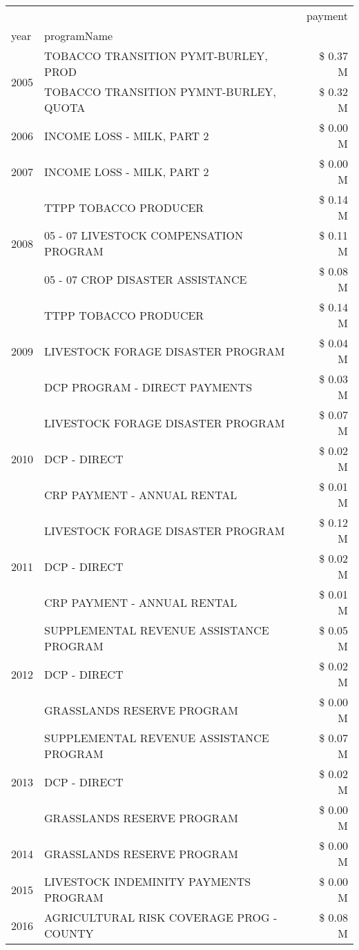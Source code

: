 \begin{tabular}{llr}
\toprule
 &  & payment \\
year & programName &  \\
\midrule
\multirow[t]{2}{*}{2005} & TOBACCO TRANSITION PYMT-BURLEY, PROD & \$ 0.37 M \\
 & TOBACCO TRANSITION PYMNT-BURLEY, QUOTA & \$ 0.32 M \\
\cline{1-3}
2006 & INCOME LOSS - MILK, PART 2 & \$ 0.00 M \\
\cline{1-3}
2007 & INCOME LOSS - MILK, PART 2 & \$ 0.00 M \\
\cline{1-3}
\multirow[t]{3}{*}{2008} & TTPP TOBACCO PRODUCER & \$ 0.14 M \\
 & 05 - 07 LIVESTOCK COMPENSATION PROGRAM & \$ 0.11 M \\
 & 05 - 07 CROP DISASTER ASSISTANCE & \$ 0.08 M \\
\cline{1-3}
\multirow[t]{3}{*}{2009} & TTPP TOBACCO PRODUCER & \$ 0.14 M \\
 & LIVESTOCK FORAGE DISASTER  PROGRAM & \$ 0.04 M \\
 & DCP PROGRAM - DIRECT PAYMENTS & \$ 0.03 M \\
\cline{1-3}
\multirow[t]{3}{*}{2010} & LIVESTOCK FORAGE DISASTER PROGRAM & \$ 0.07 M \\
 & DCP - DIRECT & \$ 0.02 M \\
 & CRP PAYMENT - ANNUAL RENTAL & \$ 0.01 M \\
\cline{1-3}
\multirow[t]{3}{*}{2011} & LIVESTOCK FORAGE DISASTER PROGRAM & \$ 0.12 M \\
 & DCP - DIRECT & \$ 0.02 M \\
 & CRP PAYMENT - ANNUAL RENTAL & \$ 0.01 M \\
\cline{1-3}
\multirow[t]{3}{*}{2012} & SUPPLEMENTAL REVENUE ASSISTANCE PROGRAM & \$ 0.05 M \\
 & DCP - DIRECT & \$ 0.02 M \\
 & GRASSLANDS RESERVE PROGRAM & \$ 0.00 M \\
\cline{1-3}
\multirow[t]{3}{*}{2013} & SUPPLEMENTAL REVENUE ASSISTANCE PROGRAM & \$ 0.07 M \\
 & DCP - DIRECT & \$ 0.02 M \\
 & GRASSLANDS RESERVE PROGRAM & \$ 0.00 M \\
\cline{1-3}
2014 & GRASSLANDS RESERVE PROGRAM & \$ 0.00 M \\
\cline{1-3}
2015 & LIVESTOCK INDEMINITY PAYMENTS PROGRAM & \$ 0.00 M \\
\cline{1-3}
\multirow[t]{2}{*}{2016} & AGRICULTURAL RISK COVERAGE PROG - COUNTY & \$ 0.08 M \\

\end{tabular}
